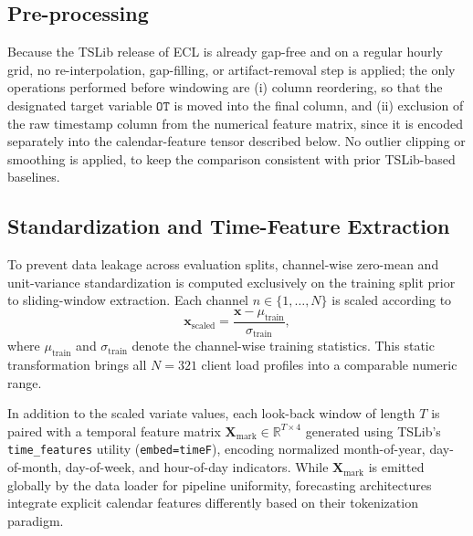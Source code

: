 \documentclass[10pt,journal]{IEEEtran}
\begin{document}
\subsection{Pre-processing}
Because the TSLib release of ECL is already gap-free and on a regular hourly grid, no re-interpolation, gap-filling, or artifact-removal step is applied; the only operations performed before windowing are (i) column reordering, so that the designated target variable $\mathtt{OT}$ is moved into the final column, and (ii) exclusion of the raw timestamp column from the numerical feature matrix, since it is encoded separately into the calendar-feature tensor described below. No outlier clipping or smoothing is applied, to keep the comparison consistent with prior TSLib-based baselines.

\subsection{Standardization and Time-Feature Extraction}
To prevent data leakage across evaluation splits, channel-wise zero-mean and unit-variance standardization is computed exclusively on the training split prior to sliding-window extraction. Each channel $n \in \{1, \dots, N\}$ is scaled according to
\begin{equation}
\bm{x}_{\mathrm{scaled}} = \frac{\bm{x} - \mu_{\mathrm{train}}}{\sigma_{\mathrm{train}}},
\end{equation}
where $\mu_{\text{train}}$ and $\sigma_{\text{train}}$ denote the channel-wise training statistics. This static transformation brings all $N = 321$ client load profiles into a comparable numeric range.

In addition to the scaled variate values, each look-back window of length $T$ is paired with a temporal feature matrix $\bm{X}_{\mathrm{mark}} \in \mathbb{R}^{T \times 4}$ generated using TSLib's \texttt{time\_features} utility (\texttt{embed=timeF}), encoding normalized month-of-year, day-of-month, day-of-week, and hour-of-day indicators. While $\bm{X}_{\text{mark}}$ is emitted globally by the data loader for pipeline uniformity, forecasting architectures integrate explicit calendar features differently based on their tokenization paradigm.
\end{document}
